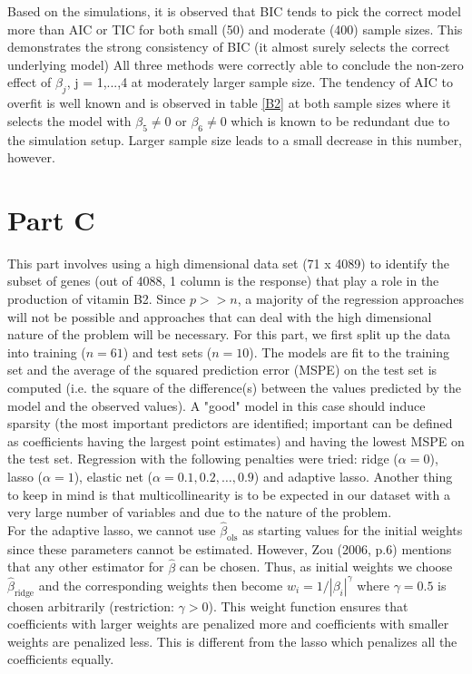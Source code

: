 \documentclass[paper=a4, fontsize=11pt]{scrartcl} %
\numberwithin{equation}{section} %
\begin{document}
Based on the simulations, it is observed that BIC tends to pick the correct model more than AIC or TIC for both small (50) and moderate (400) sample sizes. This demonstrates the strong consistency of BIC (it almost surely selects the correct underlying model) All three methods were correctly able to conclude the non-zero effect of $\beta_j$, j = 1,...,4 at moderately larger sample size. The tendency of AIC to overfit is well known and is observed in table \ref{B2} at both sample sizes where it selects the model with $\beta_5 \neq 0$  or $\beta_6 \neq 0$ which is known to be redundant due to the simulation setup. Larger sample size leads to a small decrease in this number, however.

\section{Part C}

This part involves using a high dimensional data set (71 x 4089) to identify the subset of genes (out of 4088, 1 column is the response) that play a role in the production of vitamin B2. Since $p>>n$, a majority of the regression approaches will not be possible and approaches that can deal with the high dimensional nature of the problem will be necessary. For this part, we first split up the data into training ($n=61$) and test sets ($n=10$). The models are fit to the training set and the average of the squared prediction error (MSPE) on the test set is computed (i.e. the square of the difference(s) between the values predicted by the model and the observed values). A "good" model in this case should induce sparsity (the most important predictors are identified; important can be defined as coefficients having the largest point estimates) and having the lowest MSPE on the test set. Regression with the following penalties were tried: ridge ($\alpha = 0$), lasso ($\alpha = 1$), elastic net ($\alpha = 0.1, 0.2, \ldots, 0.9$) and adaptive lasso. Another thing to keep in mind is that multicollinearity is to be expected in our dataset with a very large number of variables and due to the nature of the problem.\\

For the adaptive lasso, we cannot use $\hat{\beta}_{\text{ols}}$ as starting values for the initial weights since these parameters cannot be estimated. However, Zou (2006, p.6) \cite{zou} mentions that any other estimator for $\hat{\beta}$ can be chosen. Thus, as initial weights we choose $\hat{\beta}_{\text{ridge}}$ and the corresponding weights then become $w_i = 1/|\beta_i|^\gamma$ where $\gamma = 0.5$ is chosen arbitrarily (restriction: $\gamma>0$). This weight function ensures that coefficients with larger weights are penalized more and coefficients with smaller weights are penalized less. This is different from the lasso which penalizes all the coefficients equally.\\
\end{document}
